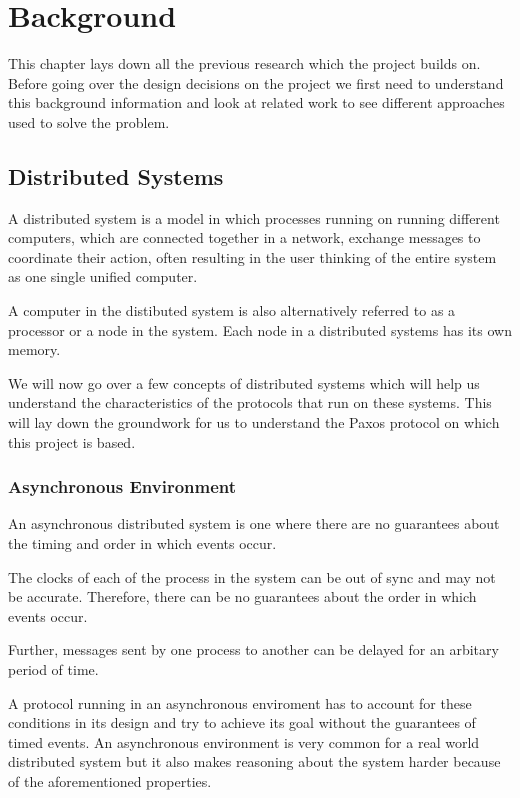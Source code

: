 \chapter{Background}
This chapter lays down all the previous research which the project builds on. Before
going over the design decisions on the project we first need to understand this
background information and look at related work to see different approaches used
to solve the problem.

\section{Distributed Systems}

A distributed system is a model in which processes running on running different
computers, which are connected together in a network, exchange messages to coordinate
their action, often resulting in the user thinking of the entire system as one single
unified computer.

A computer in the distibuted system is also alternatively referred to as a
processor or a node in the system. Each node in a distributed systems has its
own memory.


We will now go over a few concepts of distributed systems which will help us understand
the characteristics of the protocols that run on these systems. This will lay down the
groundwork for us to understand the Paxos protocol on which this project is based.

\subsection{Asynchronous Environment}
An asynchronous distributed system is one where there are no guarantees about the
timing and order in which events occur.

The clocks of each of the process in the system can be out of sync and may not be
accurate. Therefore, there can be no guarantees about the order in which events occur.

Further, messages sent by one process to another can be delayed for an arbitary period of time.

A protocol running in an asynchronous enviroment has to account for these conditions
in its design and try to achieve its goal without the guarantees of timed events.
An asynchronous environment is very common for a real world distributed system but
it also makes reasoning about the system harder because of the aforementioned properties.

